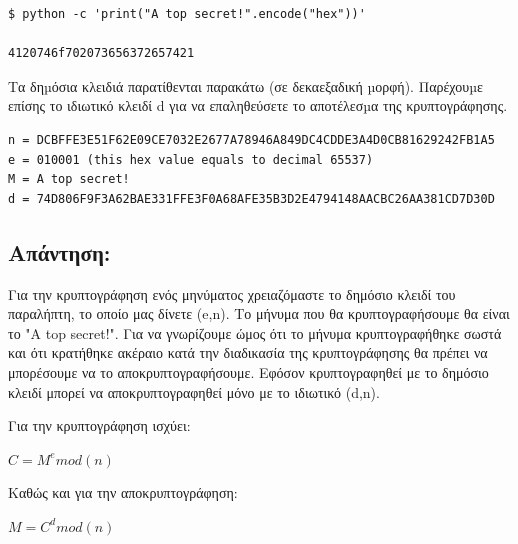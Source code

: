 \begin{lstlisting}	
$ python -c 'print("A top secret!".encode("hex"))'

4120746f702073656372657421
\end{lstlisting}

Τα δηµόσια κλειδιά παρατίθενται παρακάτω (σε δεκαεξαδική µορφή). Παρέχουµε επίσης το
ιδιωτικό κλειδί d για να επαληθεύσετε το αποτέλεσµα της κρυπτογράφησης.
\enlargethispage{\baselineskip}
\begin{lstlisting}	
n = DCBFFE3E51F62E09CE7032E2677A78946A849DC4CDDE3A4D0CB81629242FB1A5
e = 010001 (this hex value equals to decimal 65537)
M = A top secret!
d = 74D806F9F3A62BAE331FFE3F0A68AFE35B3D2E4794148AACBC26AA381CD7D30D
\end{lstlisting}


\subsection*{Απάντηση:}
\noindent
Για την κρυπτογράφηση ενός μηνύματος χρειαζόμαστε το δημόσιο κλειδί του παραλήπτη, το 
οποίο μας δίνετε (e,n). Το μήνυμα που θα κρυπτογραφήσουμε θα είναι το "A top secret!".
Για να γνωρίζουμε ώμος ότι το μήνυμα κρυπτογραφήθηκε σωστά και ότι κρατήθηκε ακέραιο
κατά την διαδικασία της κρυπτογράφησης θα πρέπει να μπορέσουμε να το αποκρυπτογραφήσουμε.
Εφόσον κρυπτογραφηθεί με το δημόσιο κλειδί μπορεί να αποκρυπτογραφηθεί μόνο με το ιδιωτικό (d,n).

Για την κρυπτογράφηση ισχύει:
\begin{center}
	\textbf{	\Large \(C=M^emod(n)\)}	
\end{center}
Καθώς και για την αποκρυπτογράφηση:
\begin{center}
	\textbf{	\Large \(M=C^dmod(n)\)}	
\end{center}
\noindent

